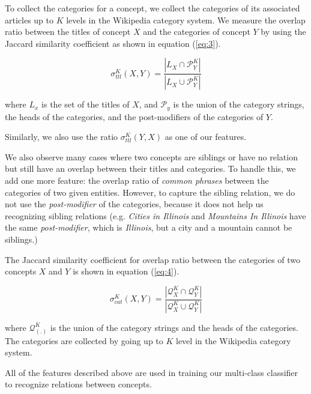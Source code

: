 To collect the categories for a concept, we collect the categories of
its associated articles up to $K$ levels in the Wikipedia category
system. We measure the overlap ratio between the titles of concept $X$
and the categories of concept $Y$ by using the Jaccard similarity
coefficient as shown in equation (\ref{eq:3}).

\begin{equation}
  \label{eq:3}
  \sigma_{ttl}^K(X,Y) = \frac{\left| L_X \cap \mathcal{P}_Y^K \right|}{\left| L_X \cup \mathcal{P}_Y^K \right|}
\end{equation}

where $L_x$ is the set of the titles of $X$, and $\mathcal{P}_y$ is
the union of the category strings, the heads of the categories, and
the post-modifiers of the categories of $Y$.

Similarly, we also use the ratio $\sigma_{ttl}^K(Y,X)$ as one of our features.


We also observe many cases where two concepts are siblings or have no
relation but still have an overlap between their titles and
categories. To handle this, we add one more feature: the overlap ratio
of {\em common phrases} between the categories of two given
entities. However, to capture the sibling relation, we do not use the
{\em post-modifier} of the categories, because it does not help us
recognizing sibling relations (e.g. {\em Cities in Illinois} and {\em
  Mountains In Illinois} have the same {\em post-modifier}, which is
{\em Illinois}, but a city and a mountain cannot be siblings.)

The Jaccard similarity coefficient for overlap ratio between the
categories of two concepts $X$ and $Y$ is shown in equation (\ref{eq:4}).

\begin{equation}
  \label{eq:4}
  \sigma_{cat}^K(X,Y) = \frac{\left| \mathcal{Q}_X^K \cap \mathcal{Q}_Y^K \right|}{\left| \mathcal{Q}_X^K \cup \mathcal{Q}_Y^K \right|}
\end{equation}

where $\mathcal{Q}_{(.)}^K$ is the union of the category strings and
the heads of the categories. The categories are collected by going up
to $K$ level in the Wikipedia category system.

All of the features described above are used in training our
multi-class classifier to recognize relations between concepts.

